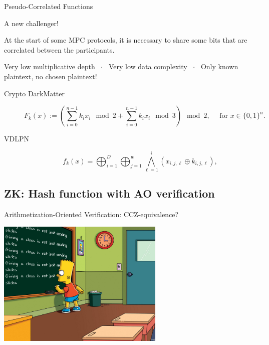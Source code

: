\documentclass[presentation,aspectratio=1610]{beamer}
\begin{document}
\begin{frame}{Pseudo-Correlated Functions}

  \begin{exampleblock}{A new challenger!}
    {\small 
      At the start of some MPC protocols, it is necessary to share some
      bits that are correlated between the participants.

      \begin{center}
        Very low multiplicative depth ~$\cdot$~ \pause
        Very low data complexity ~$\cdot$~ \pause
        \alert{Only known plaintext, no chosen plaintext!}
      \end{center}
    }
  \end{exampleblock}

  \pause
  
  \begin{description}
  \item [Crypto DarkMatter] \cite{TCC:BIPSW18}
    \begin{equation*}
      F_k(x) := \left(\sum_{i = 0}^{n-1} k_i x_i \mod 2 + \sum_{i = 0}^{n-1} k_i x_i \mod 3\right) \mod{2}, \quad \text{ for } x \in \{0,1\}^n.  
    \end{equation*}

    \pause
  \item [VDLPN] \cite{add:BCGI+20}
    \begin{equation*}
      f_k(x) = \bigoplus_{i=1}^D \bigoplus_{j=1}^w\bigwedge_{\ell=1}^i (x_{i,j,\ell} \oplus k_{i,j,\ell}),
    \end{equation*}
  \end{description}
\end{frame}


\subsection{ZK: Hash function with AO verification}



\begin{frame}{Arithmetization-Oriented Verification: CCZ-equivalence?}
  \vfill

  \begin{center}
    \includegraphics[width=8cm]{./figures/simpsons}
  \end{center}
  
  \vfill
\end{frame}
\end{document}

